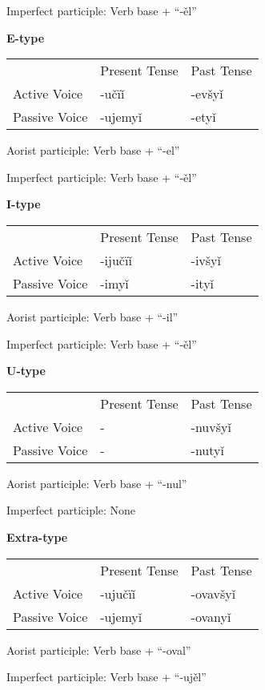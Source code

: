 Imperfect participle: Verb base + “-ěl”

\textbf{E-type}

\begin{table}
	\begin{tabular}{lll}
		& Present Tense & Past Tense \\
		Active Voice & -učïǐ & -evšyǐ \\
		Passive Voice & -ujemyǐ & -etyǐ
	\end{tabular}
\end{table}

Aorist participle: Verb base + “-el”

Imperfect participle: Verb base + “-ěl”

\textbf{I-type}

\begin{table}
	\begin{tabular}{lll}
		& Present Tense & Past Tense \\
		Active Voice & -ijučïǐ & -ivšyǐ \\
		Passive Voice & -imyǐ & -ityǐ
	\end{tabular}
\end{table}

Aorist participle: Verb base + “-il”

Imperfect participle: Verb base + “-ěl”

\textbf{U-type}

\begin{table}
	\begin{tabular}{lll}
		& Present Tense & Past Tense \\
		Active Voice & - & -nuvšyǐ \\
		Passive Voice & - & -nutyǐ
	\end{tabular}
\end{table}

Aorist participle: Verb base + “-nul”

Imperfect participle: None

\textbf{Extra-type }

\begin{table}
	\begin{tabular}{lll}
		& Present Tense & Past Tense \\
		Active Voice & -ujučïǐ & -ovavšyǐ \\
		Passive Voice & -ujemyǐ & -ovanyǐ
	\end{tabular}
\end{table}

Aorist participle: Verb base + “-oval”

Imperfect participle: Verb base + “-ujěl”
